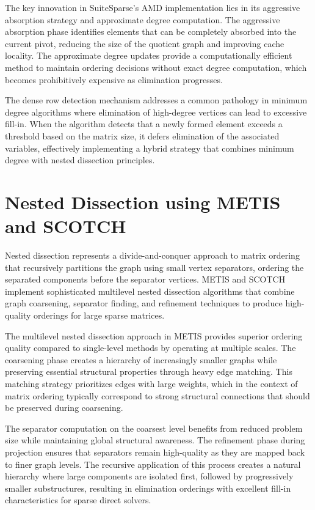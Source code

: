 The key innovation in SuiteSparse's AMD implementation lies in its aggressive absorption strategy and approximate degree computation. The aggressive absorption phase identifies elements that can be completely absorbed into the current pivot, reducing the size of the quotient graph and improving cache locality. The approximate degree updates provide a computationally efficient method to maintain ordering decisions without exact degree computation, which becomes prohibitively expensive as elimination progresses.

The dense row detection mechanism addresses a common pathology in minimum degree algorithms where elimination of high-degree vertices can lead to excessive fill-in. When the algorithm detects that a newly formed element exceeds a threshold based on the matrix size, it defers elimination of the associated variables, effectively implementing a hybrid strategy that combines minimum degree with nested dissection principles.

\section{Nested Dissection using METIS and SCOTCH}

Nested dissection represents a divide-and-conquer approach to matrix ordering that recursively partitions the graph using small vertex separators, ordering the separated components before the separator vertices. METIS and SCOTCH implement sophisticated multilevel nested dissection algorithms that combine graph coarsening, separator finding, and refinement techniques to produce high-quality orderings for large sparse matrices.

The multilevel nested dissection approach in METIS provides superior ordering quality compared to single-level methods by operating at multiple scales. The coarsening phase creates a hierarchy of increasingly smaller graphs while preserving essential structural properties through heavy edge matching. This matching strategy prioritizes edges with large weights, which in the context of matrix ordering typically correspond to strong structural connections that should be preserved during coarsening.

The separator computation on the coarsest level benefits from reduced problem size while maintaining global structural awareness. The refinement phase during projection ensures that separators remain high-quality as they are mapped back to finer graph levels. The recursive application of this process creates a natural hierarchy where large components are isolated first, followed by progressively smaller substructures, resulting in elimination orderings with excellent fill-in characteristics for sparse direct solvers.

